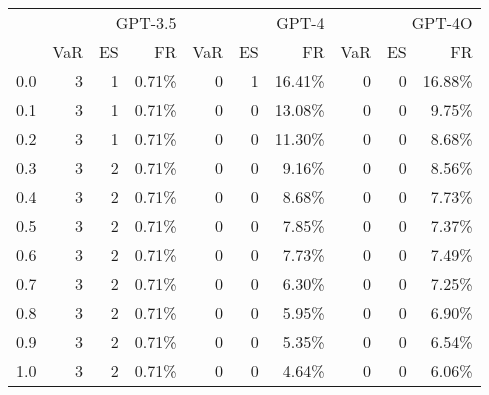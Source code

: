 \begin{tabular}{lrrrrrrrrr}
\toprule
 & \multicolumn{3}{r}{GPT-3.5} & \multicolumn{3}{r}{GPT-4} & \multicolumn{3}{r}{GPT-4O} \\
 & VaR & ES & FR & VaR & ES & FR & VaR & ES & FR \\
\midrule
0.0 & \cellcolor{green!70!white} 3 & \cellcolor{red!30!white} 1 & 0.71\% & \cellcolor{red!70!white} 0 & \cellcolor{red!30!white} 1 & 16.41\% & \cellcolor{red!70!white} 0 & \cellcolor{red!70!white} 0 & 16.88\% \\
0.1 & \cellcolor{green!70!white} 3 & \cellcolor{red!30!white} 1 & 0.71\% & \cellcolor{red!70!white} 0 & \cellcolor{red!70!white} 0 & 13.08\% & \cellcolor{red!70!white} 0 & \cellcolor{red!70!white} 0 & 9.75\% \\
0.2 & \cellcolor{green!70!white} 3 & \cellcolor{red!30!white} 1 & 0.71\% & \cellcolor{red!70!white} 0 & \cellcolor{red!70!white} 0 & 11.30\% & \cellcolor{red!70!white} 0 & \cellcolor{red!70!white} 0 & 8.68\% \\
0.3 & \cellcolor{green!70!white} 3 & \cellcolor{green!70!white} 2 & 0.71\% & \cellcolor{red!70!white} 0 & \cellcolor{red!70!white} 0 & 9.16\% & \cellcolor{red!70!white} 0 & \cellcolor{red!70!white} 0 & 8.56\% \\
0.4 & \cellcolor{green!70!white} 3 & \cellcolor{green!70!white} 2 & 0.71\% & \cellcolor{red!70!white} 0 & \cellcolor{red!70!white} 0 & 8.68\% & \cellcolor{red!70!white} 0 & \cellcolor{red!70!white} 0 & 7.73\% \\
0.5 & \cellcolor{green!70!white} 3 & \cellcolor{green!70!white} 2 & 0.71\% & \cellcolor{red!70!white} 0 & \cellcolor{red!70!white} 0 & 7.85\% & \cellcolor{red!70!white} 0 & \cellcolor{red!70!white} 0 & 7.37\% \\
0.6 & \cellcolor{green!70!white} 3 & \cellcolor{green!70!white} 2 & 0.71\% & \cellcolor{red!70!white} 0 & \cellcolor{red!70!white} 0 & 7.73\% & \cellcolor{red!70!white} 0 & \cellcolor{red!70!white} 0 & 7.49\% \\
0.7 & \cellcolor{green!70!white} 3 & \cellcolor{green!70!white} 2 & 0.71\% & \cellcolor{red!70!white} 0 & \cellcolor{red!70!white} 0 & 6.30\% & \cellcolor{red!70!white} 0 & \cellcolor{red!70!white} 0 & 7.25\% \\
0.8 & \cellcolor{green!70!white} 3 & \cellcolor{green!70!white} 2 & 0.71\% & \cellcolor{red!70!white} 0 & \cellcolor{red!70!white} 0 & 5.95\% & \cellcolor{red!70!white} 0 & \cellcolor{red!70!white} 0 & 6.90\% \\
0.9 & \cellcolor{green!70!white} 3 & \cellcolor{green!70!white} 2 & 0.71\% & \cellcolor{red!70!white} 0 & \cellcolor{red!70!white} 0 & 5.35\% & \cellcolor{red!70!white} 0 & \cellcolor{red!70!white} 0 & 6.54\% \\
1.0 & \cellcolor{green!70!white} 3 & \cellcolor{green!70!white} 2 & 0.71\% & \cellcolor{red!70!white} 0 & \cellcolor{red!70!white} 0 & 4.64\% & \cellcolor{red!70!white} 0 & \cellcolor{red!70!white} 0 & 6.06\% \\
\bottomrule
\end{tabular}
